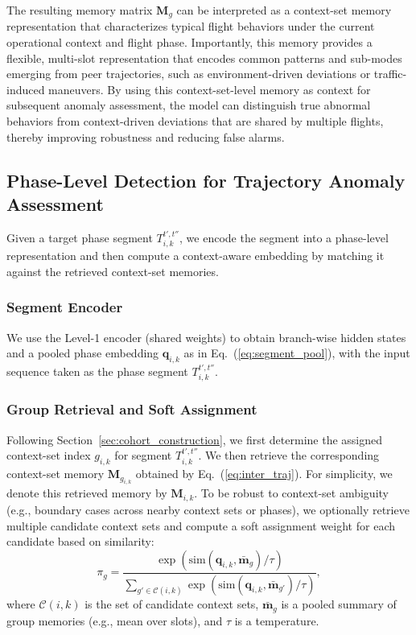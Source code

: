 \documentclass[iicol,pdflatex,sn-basic,Numbered]{sn-jnl}%
\theoremstyle{thmstyleone}%
\theoremstyle{thmstyletwo}%
\theoremstyle{thmstylethree}%
\begin{document}
The resulting memory matrix $\mathbf{M}_g$ can be interpreted as a context-set memory representation that characterizes typical flight behaviors under the current operational context and flight phase. Importantly, this memory provides a flexible, multi-slot representation that encodes common patterns and sub-modes emerging from peer trajectories, such as environment-driven deviations or traffic-induced maneuvers.
By using this context-set-level memory as context for subsequent anomaly assessment, the model can distinguish true abnormal behaviors from context-driven deviations that are shared by multiple flights, thereby improving robustness and reducing false alarms.

\subsection{Phase-Level Detection for Trajectory Anomaly Assessment}
\label{sec:segment_detection}
Given a target phase segment $T^{t',t''}_{i,k}$, we encode the segment into a phase-level representation and then compute a context-aware embedding by matching it against the retrieved context-set memories.


\subsubsection{Segment Encoder}

We use the Level-1 encoder (shared weights) to obtain branch-wise hidden states and a pooled phase embedding $\mathbf{q}_{i,k}$ as in Eq.~(\ref{eq:segment_pool}), with the input sequence taken as the phase segment $T^{t',t''}_{i,k}$.


\subsubsection{Group Retrieval and Soft Assignment}

Following Section~\ref{sec:cohort_construction}, we first determine the assigned context-set index $g_{i,k}$ for segment $T^{t',t''}_{i,k}$.
We then retrieve the corresponding context-set memory $\mathbf{M}_{g_{i,k}}$ obtained by Eq.~(\ref{eq:inter_traj}).
For simplicity, we denote this retrieved memory by $\mathbf{M}_{i,k}$.
To be robust to context-set ambiguity (e.g., boundary cases across nearby context sets or phases), we optionally retrieve multiple candidate context sets and compute a soft assignment weight for each candidate based on similarity:
\begin{equation}
\label{eq:soft_assign}
\pi_g = \frac{\exp(\text{sim}(\mathbf{q}_{i,k}, \bar{\mathbf{m}}_g)/\tau)}{\sum\limits_{g'\in\mathcal{C}(i,k)} \exp(\text{sim}(\mathbf{q}_{i,k}, \bar{\mathbf{m}}_{g'})/\tau)},
\end{equation}
where $\mathcal{C}(i,k)$ is the set of candidate context sets, $\bar{\mathbf{m}}_g$ is a pooled summary of group memories (e.g., mean over slots), and $\tau$ is a temperature.
\end{document}
